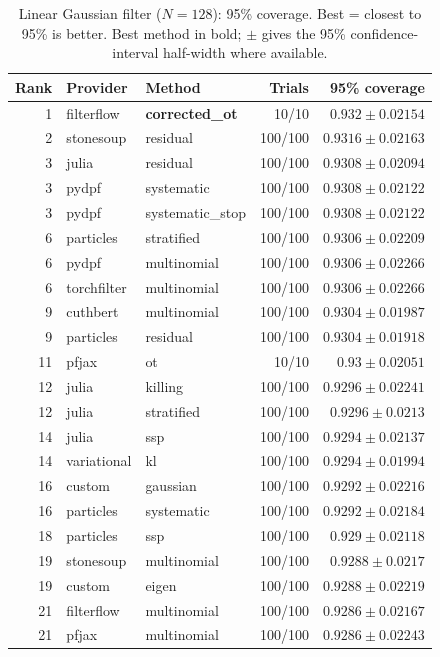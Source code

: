 \begin{table}[!htbp]
\centering
\small
\caption{Linear Gaussian filter ($N=128$): 95\% coverage. Best = closest to 95\% is better. Best method in bold; $\pm$ gives the 95\% confidence-interval half-width where available.}
\label{tab:linear-gaussian-filter-coverage95}
\begin{tabular}{rllrr}
\toprule
Rank & Provider & Method & Trials & 95\% coverage \\
\midrule
1 & filterflow & \textbf{corrected\_ot} & 10/10 & $\mathbf{0.932 \pm 0.02154}$ \\
2 & stonesoup & residual & 100/100 & $0.9316 \pm 0.02163$ \\
3 & julia & residual & 100/100 & $0.9308 \pm 0.02094$ \\
3 & pydpf & systematic & 100/100 & $0.9308 \pm 0.02122$ \\
3 & pydpf & systematic\_stop & 100/100 & $0.9308 \pm 0.02122$ \\
6 & particles & stratified & 100/100 & $0.9306 \pm 0.02209$ \\
6 & pydpf & multinomial & 100/100 & $0.9306 \pm 0.02266$ \\
6 & torchfilter & multinomial & 100/100 & $0.9306 \pm 0.02266$ \\
9 & cuthbert & multinomial & 100/100 & $0.9304 \pm 0.01987$ \\
9 & particles & residual & 100/100 & $0.9304 \pm 0.01918$ \\
11 & pfjax & ot & 10/10 & $0.93 \pm 0.02051$ \\
12 & julia & killing & 100/100 & $0.9296 \pm 0.02241$ \\
12 & julia & stratified & 100/100 & $0.9296 \pm 0.0213$ \\
14 & julia & ssp & 100/100 & $0.9294 \pm 0.02137$ \\
14 & variational & kl & 100/100 & $0.9294 \pm 0.01994$ \\
16 & custom & gaussian & 100/100 & $0.9292 \pm 0.02216$ \\
16 & particles & systematic & 100/100 & $0.9292 \pm 0.02184$ \\
18 & particles & ssp & 100/100 & $0.929 \pm 0.02118$ \\
19 & stonesoup & multinomial & 100/100 & $0.9288 \pm 0.0217$ \\
19 & custom & eigen & 100/100 & $0.9288 \pm 0.02219$ \\
21 & filterflow & multinomial & 100/100 & $0.9286 \pm 0.02167$ \\
21 & pfjax & multinomial & 100/100 & $0.9286 \pm 0.02243$ \\

\end{tabular}
\end{table}
